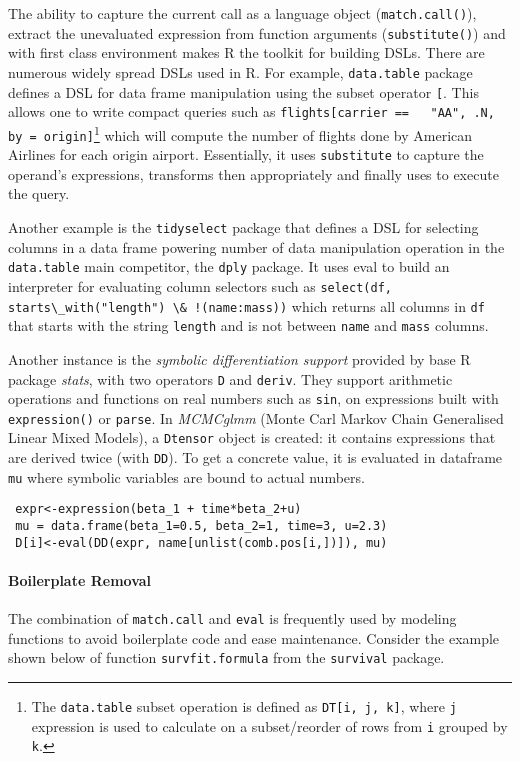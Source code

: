 \documentclass[screen,acmsmall]{acmart}%
\newcommand{\code}[1]{\lstinline |#1|\xspace}
\begin{document}
The ability to capture the current call as a language object (\code{match.call()}),
extract the unevaluated expression from function arguments (\code{substitute()})
and \eval with first class environment makes R the toolkit for building DSLs.
There are numerous widely spread DSLs used in R. For example, \code{data.table}
package defines a DSL for data frame manipulation using the subset operator
\code{[}. This allows one to write compact queries such as \code{flights[carrier ==
  "AA", .N, by = origin]}\footnote{The \code{data.table} subset operation is
  defined as \code{DT[i, j, k]}, where \code{j} expression is used to calculate on a
  subset/reorder of rows from \code{i} grouped by \code{k}.} which will compute the
number of flights done by American Airlines for each origin airport.
Essentially, it uses \code{substitute} to capture the operand's expressions,
transforms then appropriately and finally uses \eval to execute the query.

Another example is the \code{tidyselect} package that defines a DSL for selecting
columns in a data frame powering number of data manipulation operation in the
\code{data.table} main competitor, the \code{dply} package. It uses eval to build an
interpreter for evaluating column selectors such as \code{select(df,
starts\_with("length") \& !(name:mass))} which returns all columns in \code{df}
that starts with the string \code{length} and is not between \code{name} and
\code{mass} columns.


Another instance is the \emph{symbolic differentiation support} provided by base R package \emph{stats}, with two operators \code{D} and \code{deriv}. They support arithmetic operations and functions on real numbers such as \code{sin}, on expressions built with \code{expression()} or \code{parse}.
In \emph{MCMCglmm} (Monte Carl Markov Chain Generalised Linear Mixed Models), a \code{Dtensor} object is created: it contains expressions that are derived twice (with \code{DD}). To get a concrete value, it is evaluated in  dataframe \code{mu} where symbolic variables are bound to actual numbers.
\begin{lstlisting}
 expr<-expression(beta_1 + time*beta_2+u)
 mu = data.frame(beta_1=0.5, beta_2=1, time=3, u=2.3)
 D[i]<-eval(DD(expr, name[unlist(comb.pos[i,])]), mu)
\end{lstlisting}


\paragraph{Boilerplate Removal} The combination of \code{match.call} and \code{eval}
is frequently used by modeling functions to avoid boilerplate code and ease
maintenance. Consider the example shown below of function \code{survfit.formula}
from the \code{survival} package.
\end{document}
